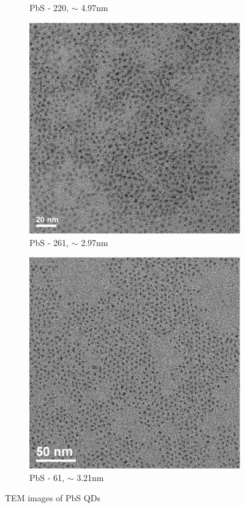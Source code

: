 \begin{figure}[htpb]
\begin{subfigure}{0.23\textwidth}
			\caption{PbS - 220, \diameter $\sim$ 4.97nm}
		\end{subfigure}
		\hfill
		\begin{subfigure}{0.23\textwidth}
			\includegraphics[width=\textwidth]{Fig/Plots/PbS_261_TEM.eps}
			\caption{PbS - 261, \diameter $\sim$ 2.97nm}
		\end{subfigure}
		\hfill
		\begin{subfigure}{0.23\textwidth}
			\includegraphics[width=\textwidth]{Fig/Plots/PbS_61_TEM.eps}
			\caption{PbS - 61, \diameter $\sim$ 3.21nm}
		\end{subfigure}
		\caption{\gls{TEM} images of PbS \glspl{QD}}
		\label{fig:PbS_TEM}	
	\end{figure}

